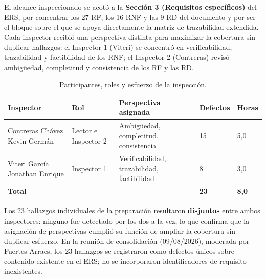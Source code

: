 \documentclass[journal,onecolumn]{IEEEtran}
\begin{document}
El alcance inspeccionado se acotó a la \textbf{Sección 3 (Requisitos específicos)} del ERS, por concentrar los 27 RF, los 16 RNF y las 9 RD del documento y por ser el bloque sobre el que se apoya directamente la matriz de trazabilidad extendida. Cada inspector recibió una perspectiva distinta para maximizar la cobertura sin duplicar hallazgos: el Inspector 1 (Viteri) se concentró en verificabilidad, trazabilidad y factibilidad de los RNF; el Inspector 2 (Contreras) revisó ambigüedad, completitud y consistencia de los RF y las RD.

\begin{table}[H]
	\centering
	\caption{Participantes, roles y esfuerzo de la inspección.}
	\label{tab:roles-inspeccion}
	\small
	\begin{tabularx}{\textwidth}{|L{4.5cm}|L{3cm}|X|C{2cm}|C{1.5cm}|}
		\hline
		\textbf{Inspector} & \textbf{Rol} & \textbf{Perspectiva asignada} & \textbf{Defectos} & \textbf{Horas} \\
		\hline
		Contreras Chávez Kevin Germán & Lector e Inspector 2 & Ambigüedad, completitud, consistencia & 15 & 5,0 \\
		\hline
		Viteri García Jonathan Enrique & Inspector 1 & Verificabilidad, trazabilidad, factibilidad & 8 & 3,0 \\
		\hline
		\textbf{Total} & & & \textbf{23} & \textbf{8,0} \\
		\hline
	\end{tabularx}
\end{table}

Los 23 hallazgos individuales de la preparación resultaron \textbf{disjuntos} entre ambos inspectores: ninguno fue detectado por los dos a la vez, lo que confirma que la asignación de perspectivas cumplió su función de ampliar la cobertura sin duplicar esfuerzo. En la reunión de consolidación (09/08/2026), moderada por Fuertes Arraes, los 23 hallazgos se registraron como defectos únicos sobre contenido existente en el ERS; no se incorporaron identificadores de requisito inexistentes.
\end{document}
